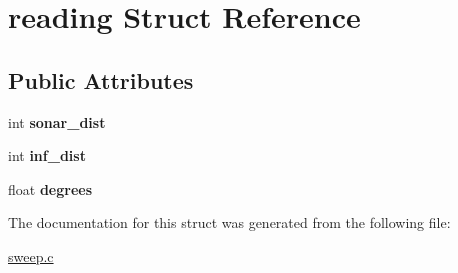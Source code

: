 \hypertarget{structreading}{}\section{reading Struct Reference}
\label{structreading}
\subsection*{Public Attributes}
\begin{DoxyCompactItemize}
\item 
\hypertarget{structreading_ab8a9574795f308b698782f314ffe0284}{}int {\bfseries sonar\+\_\+dist}\label{structreading_ab8a9574795f308b698782f314ffe0284}

\item 
\hypertarget{structreading_a838fa0e2f1bb431902c31ae83ffe7984}{}int {\bfseries inf\+\_\+dist}\label{structreading_a838fa0e2f1bb431902c31ae83ffe7984}

\item 
\hypertarget{structreading_a63e04a81401e73c36aa25872e895d972}{}float {\bfseries degrees}\label{structreading_a63e04a81401e73c36aa25872e895d972}

\end{DoxyCompactItemize}


The documentation for this struct was generated from the following file\+:\begin{DoxyCompactItemize}
\item 
\hyperlink{sweep_8c}{sweep.\+c}\end{DoxyCompactItemize}
